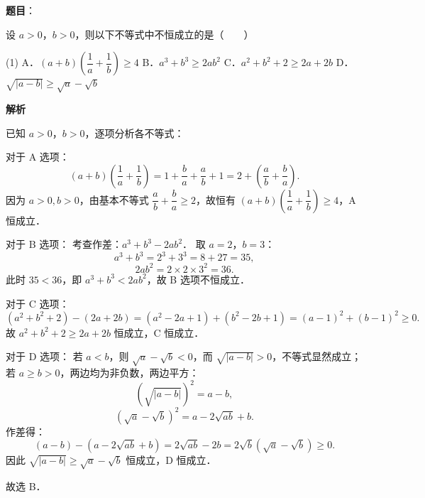 \begin{answer}

\textbf{题目}：

设 $a > 0$，$b > 0$，则以下不等式中不恒成立的是\mbox{（　　）}

\begin{gkopts}(1)
\task A．$(a + b)\left(\dfrac{1}{a} + \dfrac{1}{b}\right) \geqslant 4$
\task B．$a^3 + b^3 \geqslant 2ab^2$
\task C．$a^2 + b^2 + 2 \geqslant 2a + 2b$
\task D．$\sqrt{|a - b|} \geqslant \sqrt{a} - \sqrt{b}$
\end{gkopts}

\textbf{解析}

已知 $a > 0$，$b > 0$，逐项分析各不等式：

对于 A 选项：
\nopagebreak[4]
\[
(a + b)\left(\frac{1}{a} + \frac{1}{b}\right) = 1 + \frac{b}{a} + \frac{a}{b} + 1 = 2 + \left(\frac{a}{b} + \frac{b}{a}\right).
\]
因为 $a > 0, b > 0$，由基本不等式 $\dfrac{a}{b} + \dfrac{b}{a} \geqslant 2$，故恒有 $(a + b)\left(\dfrac{1}{a} + \dfrac{1}{b}\right) \geqslant 4$，A 恒成立．

对于 B 选项：
考查作差：$a^3 + b^3 - 2ab^2$．
取 $a = 2$，$b = 3$：
\nopagebreak[4]
\[
a^3 + b^3 = 2^3 + 3^3 = 8 + 27 = 35,
\]
\nopagebreak[4]
\[
2ab^2 = 2 \times 2 \times 3^2 = 36.
\]
此时 $35 < 36$，即 $a^3 + b^3 < 2ab^2$，故 B 选项不恒成立．

对于 C 选项：
\nopagebreak[4]
\[
(a^2 + b^2 + 2) - (2a + 2b) = (a^2 - 2a + 1) + (b^2 - 2b + 1) = (a - 1)^2 + (b - 1)^2 \geqslant 0.
\]
故 $a^2 + b^2 + 2 \geqslant 2a + 2b$ 恒成立，C 恒成立．

对于 D 选项：
若 $a < b$，则 $\sqrt{a} - \sqrt{b} < 0$，而 $\sqrt{|a - b|} > 0$，不等式显然成立；
若 $a \geqslant b > 0$，两边均为非负数，两边平方：
\nopagebreak[4]
\[
\left(\sqrt{|a - b|}\right)^2 = a - b,
\]
\nopagebreak[4]
\[
\left(\sqrt{a} - \sqrt{b}\right)^2 = a - 2\sqrt{ab} + b.
\]
作差得：
\nopagebreak[4]
\[
(a - b) - (a - 2\sqrt{ab} + b) = 2\sqrt{ab} - 2b = 2\sqrt{b}(\sqrt{a} - \sqrt{b}) \geqslant 0.
\]
因此 $\sqrt{|a - b|} \geqslant \sqrt{a} - \sqrt{b}$ 恒成立，D 恒成立．

故选 B．


\end{answer}
